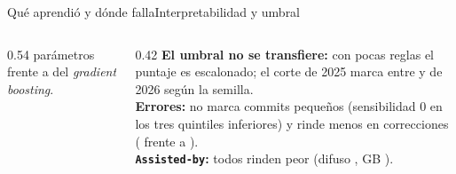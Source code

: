 \documentclass[aspectratio=169,10pt]{beamer}
\begin{document}
\begin{frame}{Qué aprendió y dónde falla}{Interpretabilidad y umbral}
  \begin{columns}[T,onlytextwidth]
    \begin{column}{0.54\textwidth}
      \vspace{0.12cm}
      {\fontsize{8pt}{9.5pt}\selectfont \cifParamFE{} parámetros frente a \cifParamGBprueba{} del \emph{gradient boosting}.}
    \end{column}
    \begin{column}{0.42\textwidth}
      {\fontsize{8.3pt}{10pt}\selectfont
      \textbf{El umbral no se transfiere:} con pocas reglas el puntaje es escalonado; el corte de 2025 marca entre \cifFEMarcMin{} y \cifFEMarcMax{} de 2026 según la semilla.\\[5pt]
      \textbf{Errores:} no marca commits pequeños (sensibilidad 0 en los tres quintiles inferiores) y rinde menos en correcciones (\cifErrFixAp{} frente a \cifErrNoFixAp).\\[5pt]
      \textbf{\texttt{Assisted-by}:} todos rinden peor (difuso \cifAssistedFE{}, GB \cifAssistedGB).}
    \end{column}
  \end{columns}
\end{frame}
\end{document}
